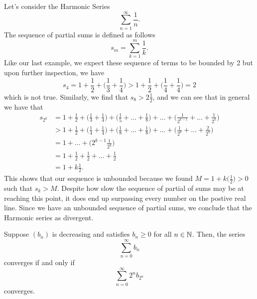\begin{ex}
    Let's consider the Harmonic Series 
    \[ \sum_{n=1}^{ \infty} \frac{1}{n}. \]
    The sequence of partial sums is defined as follows
    \[ s_m = \sum_{k=1}^{m} \frac{1}{k}.\]
    Like our last example, we expect these sequence of terms to be bounded by 2 but upon further inspection, we have 
    \[ s_4 = 1  + \frac{1}{2} + \Big( \frac{1}{3} + \frac{1}{4} \Big) > 1 + \frac{1}{2} + \Big( \frac{1}{4}+ \frac{1}{4} \Big) = 2\]
    which is not true. Similarly, we find that \( s_8 > 2 \frac{1}{2}\), and we can see that in general we have that 
    \begin{align*}
        s_{2^k}&= 1 + \frac{1}{2} + \Big( \frac{1}{3} + \frac{1}{4} \Big) + \Big( \frac{1}{5} + ... + \frac{1}{8} \Big) + ... + \Big( \frac{1}{2^{k-1}} + ... + \frac{1}{2^k} \Big) \\
               &> 1 + \frac{1}{2} + \Big( \frac{1}{4} + \frac{1}{4}\Big) + \Big( \frac{1}{8} + ... + \frac{1}{8}\Big) + ... + \Big( \frac{1}{2^k} + ... + \frac{2}{2^k}\Big) \\
               &= 1 +... + \Big( 2^{k-1} \frac{1}{2^k}\Big) \\ 
               &= 1 + \frac{1}{2} + \frac{1}{2} + ... + \frac{1}{2} \\
               &= 1 + k\frac{1}{2}.
    \end{align*}
    This shows that our sequence is unbounded because we found \( M = 1 + k \Big( \frac{1}{2}\Big) > 0\) such that \( s_k > M \). Despite how slow the sequence of partial of sums may be at reaching this point, it does end up surpassing every number on the postive real line. Since we have an unbounded sequence of partial sums, we conclude that the Harmonic series as divergent.

\end{ex}


\begin{tcolorbox}
    \begin{thm}
    Suppose \( (b_n)\) is decreasing and satisfies \( b_n \geq 0  \) for all \( n \in \mathbb{N} \). Then, the series 
    \[ \sum_{n=0}^{ \infty} b_n \]
    converges if and only if 
    \[ \sum_{n=0}^{ \infty} 2^n b_{2^n}\]
converges.
\end{thm}
\end{tcolorbox} 

